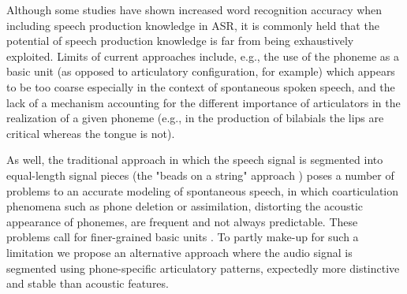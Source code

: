 Although some studies have shown increased word recognition accuracy when including speech
production knowledge in ASR, it is commonly held that the potential of speech production
knowledge is far from being exhaustively exploited. Limits of current approaches include, e.g.,
the use of the phoneme as a basic unit (as opposed to articulatory configuration, for example)
which appears to be too coarse especially in the context of spontaneous spoken speech,
and the lack of a mechanism accounting for the different importance of articulators in the
realization of a given phoneme (e.g., in the production of bilabials the lips are critical whereas
the tongue is not).

As well, the traditional approach in which the speech signal is segmented into equal-length signal
pieces (the "beads on a string" approach \cite{ostendorf}) poses a number of problems to an accurate modeling of
spontaneous speech, in which coarticulation phenomena such as phone deletion or assimilation,
distorting the acoustic appearance of phonemes, are frequent and not always predictable. These problems
call for finer-grained basic units \cite{ostendorf}. To partly make-up for such a limitation we propose
an alternative approach where the audio signal is segmented using phone-specific articulatory patterns,
expectedly more distinctive and stable than acoustic features.


